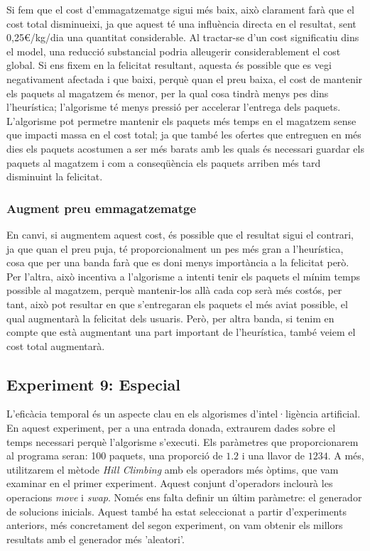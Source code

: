 \documentclass[a4paper]{article}
\begin{document}
	Si fem que el cost d'emmagatzematge sigui més baix, això clarament farà que el cost total disminueixi, ja que aquest té una influència directa en el resultat, sent 0,25€/kg/dia una quantitat considerable. Al tractar-se d'un cost significatiu dins el model, una reducció substancial podria alleugerir considerablement el cost global. Si ens fixem en la felicitat resultant, aquesta és possible que es vegi negativament afectada i que baixi, perquè quan el preu baixa, el cost de mantenir els paquets al magatzem és menor, per la qual cosa tindrà menys pes dins l'heurística; l'algorisme té menys pressió per accelerar l'entrega dels paquets. L'algorisme pot permetre mantenir els paquets més temps en el magatzem sense que impacti massa en el cost total; ja que també les ofertes que entreguen en més dies els paquets acostumen a ser més barats amb les quals és necessari guardar els paquets al magatzem i com a conseqüència els paquets arriben més tard disminuint la felicitat.\\
	
	\subsubsection{Augment preu emmagatzematge}
	
	En canvi, si augmentem aquest cost, és possible que el resultat sigui el contrari, ja que quan el preu puja, té proporcionalment un pes més gran a l'heurística, cosa que per una banda farà que es doni menys importància a la felicitat però. Per l'altra, això incentiva a l'algorisme a intenti tenir els paquets el mínim temps possible al magatzem, perquè mantenir-los allà cada cop serà més costós, per tant, això pot resultar en que s'entregaran els paquets el més aviat possible, el qual augmentarà la felicitat dels usuaris. Però, per altra banda, si tenim en compte que està augmentant una part important de l'heurística, també veiem el cost total augmentarà.\\
	
	
	\subsection{Experiment 9: Especial}
	
	L'eficàcia temporal és un aspecte clau en els algorismes d'intel·ligència artificial. En aquest experiment, per a una entrada donada, extraurem dades sobre el temps necessari perquè l'algorisme s'executi. Els paràmetres que proporcionarem al programa seran: 100 paquets, una proporció de $1.2$ i una llavor de $1234$. A més, utilitzarem el mètode \textit{Hill Climbing} amb els operadors més òptims, que vam examinar en el primer experiment. Aquest conjunt d'operadors inclourà les operacions \textit{move} i \textit{swap}. Només ens falta definir un últim paràmetre: el generador de solucions inicials. Aquest també ha estat seleccionat a partir d'experiments anteriors, més concretament del segon experiment, on vam obtenir els millors resultats amb el generador més 'aleatori'. \\
	
\end{document}
